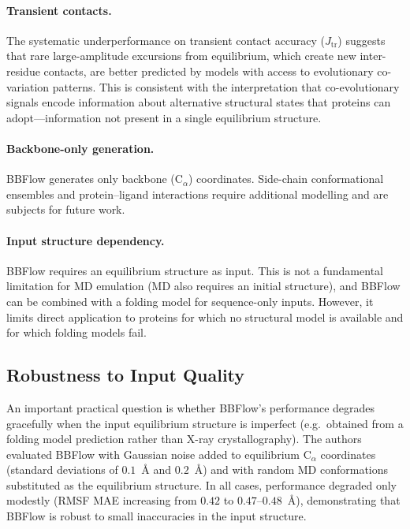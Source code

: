 \documentclass[12pt,a4paper]{article}
\begin{document}
\paragraph{Transient contacts.}
The systematic underperformance on transient contact accuracy ($J_{\mathrm{tr}}$) suggests
that rare large-amplitude excursions from equilibrium, which create new inter-residue contacts,
are better predicted by models with access to evolutionary co-variation patterns.  This is
consistent with the interpretation that co-evolutionary signals encode information about
alternative structural states that proteins can adopt---information not present in a single
equilibrium structure.

\paragraph{Backbone-only generation.}
BBFlow generates only backbone (C$_\alpha$) coordinates.  Side-chain conformational ensembles
and protein--ligand interactions require additional modelling and are subjects for future work.

\paragraph{Input structure dependency.}
BBFlow requires an equilibrium structure as input.  This is not a fundamental limitation for
MD emulation (MD also requires an initial structure), and BBFlow can be combined with a
folding model for sequence-only inputs.  However, it limits direct application to proteins
for which no structural model is available and for which folding models fail.

\subsection{Robustness to Input Quality}
\label{sec:robustness}

An important practical question is whether BBFlow's performance degrades gracefully when
the input equilibrium structure is imperfect (e.g.\ obtained from a folding model prediction
rather than X-ray crystallography).  The authors evaluated BBFlow with Gaussian noise added
to equilibrium C$_\alpha$ coordinates (standard deviations of $0.1$~Å and $0.2$~Å) and with
random MD conformations substituted as the equilibrium structure.  In all cases, performance
degraded only modestly (RMSF MAE increasing from $0.42$ to $0.47$--$0.48$~Å), demonstrating
that BBFlow is robust to small inaccuracies in the input structure.
\end{document}
